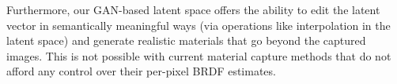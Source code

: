 Furthermore, our GAN-based latent space offers the ability to edit the latent vector in semantically meaningful ways (via operations like interpolation in the latent space) and generate realistic materials that go beyond the captured images.
This is not possible with current material capture methods that do not afford any control over their per-pixel BRDF estimates.










